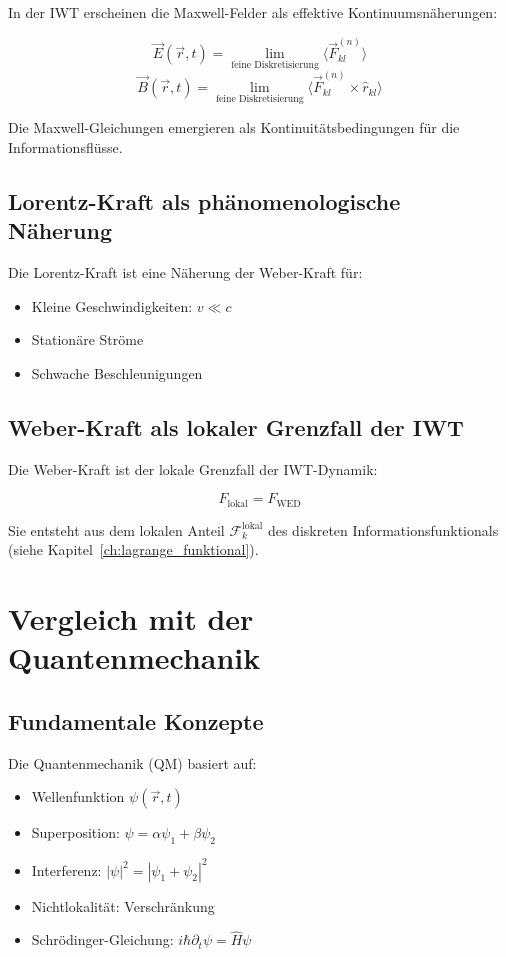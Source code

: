 In der IWT erscheinen die Maxwell-Felder als effektive Kontinuumsnäherungen:

\[
\vec{E}(\vec{r}, t) = \lim_{\text{feine Diskretisierung}} \langle \vec{F}_{kl}^{(n)} \rangle
\]
\[
\vec{B}(\vec{r}, t) = \lim_{\text{feine Diskretisierung}} \langle \vec{F}_{kl}^{(n)} \times \hat{r}_{kl} \rangle
\]

Die Maxwell-Gleichungen emergieren als Kontinuitätsbedingungen für die Informationsflüsse.

\subsection{Lorentz-Kraft als phänomenologische Näherung}
\label{sub:vergleich_elektro_lorentz}

Die Lorentz-Kraft ist eine Näherung der Weber-Kraft für:

\begin{itemize}
    \item Kleine Geschwindigkeiten: \( v \ll c \)
    \item Stationäre Ströme
    \item Schwache Beschleunigungen
\end{itemize}

\subsection{Weber-Kraft als lokaler Grenzfall der IWT}
\label{sub:vergleich_elektro_weber}

Die Weber-Kraft ist der lokale Grenzfall der IWT-Dynamik:

\[
F_{\text{lokal}} = F_{\text{WED}}
\]

Sie entsteht aus dem lokalen Anteil \( \mathcal{F}_k^{\text{lokal}} \) des diskreten Informationsfunktionals (siehe Kapitel~\ref{ch:lagrange_funktional}).

\section{Vergleich mit der Quantenmechanik}
\label{app:vergleich_quantenmechanik}

\subsection{Fundamentale Konzepte}
\label{sub:vergleich_quanten_konzepte}

Die Quantenmechanik (QM) basiert auf:

\begin{itemize}
    \item Wellenfunktion \( \psi(\vec{r}, t) \)
    \item Superposition: \( \psi = \alpha\psi_1 + \beta\psi_2 \)
    \item Interferenz: \( |\psi|^2 = |\psi_1 + \psi_2|^2 \)
    \item Nichtlokalität: Verschränkung
    \item Schrödinger-Gleichung: \( i\hbar\partial_t\psi = \hat{H}\psi \)
\end{itemize}

